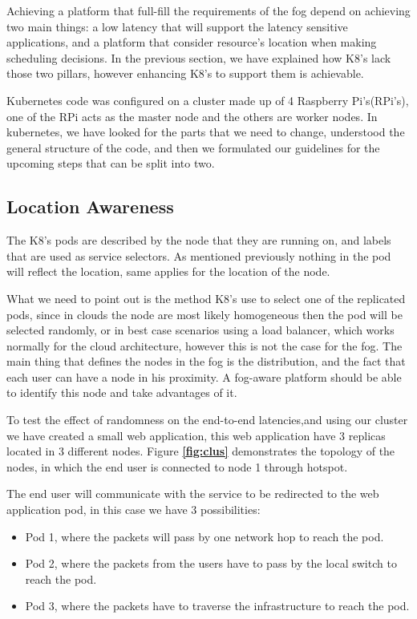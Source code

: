 \documentclass[letterpaper,twocolumn,10pt]{article}
\let\origref\ref
\def\ref#1{\textbf{\origref{#1}}}
\begin{document}
Achieving a platform that full-fill the requirements of the fog depend on achieving two main things: a low latency that will support the latency sensitive applications, and a platform that consider resource's location when making scheduling decisions. In the previous section, we have explained how K8's lack those two pillars, however enhancing K8's to support them is achievable.

Kubernetes code was configured on a cluster made up of 4 Raspberry Pi's(RPi's), one of the RPi acts as the master node and the others are worker nodes. In kubernetes, we have looked for the parts that we need to change, understood the general structure of the code, and then we formulated our guidelines for the upcoming steps that can be split into two. 
 
\subsection{Location Awareness}

The K8's pods are described by the node that they are running on, and labels that are used as service selectors. As mentioned previously nothing in the pod will reflect the location, same applies for the location of the node. 

What we need to point out is the method K8's use to select one of the replicated pods, since in clouds the node are most likely homogeneous then the pod will be selected randomly, or in best case scenarios using a load balancer, which works normally for the cloud architecture, however this is not the case for the fog. The main thing that defines the nodes in the fog is the distribution, and the fact that each user can have a node in his proximity. A fog-aware platform should be able to identify this node and take advantages of it. 

To test the effect of randomness on the end-to-end latencies,and using our cluster we have created a small web application, this web application have 3 replicas located in 3 different nodes. Figure \ref{fig:clus} demonstrates the topology of the nodes, in which the end user is connected to node 1 through hotspot.

The end user will communicate with the service to be redirected to the web application pod, in this case we have 3 possibilities: 
\begin{itemize}
\item Pod 1, where the packets will pass by one network hop to reach the pod. 
\item Pod 2, where the packets from the users have to pass by the local switch to reach the pod.
\item Pod 3, where the packets have to traverse the infrastructure to reach the pod.
\end{itemize}
 
\end{document}
